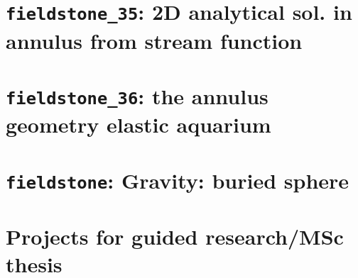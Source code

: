 \documentclass[a4paper]{article}
\begin{document}
\newpage
\section{{\tt fieldstone\_35}: 2D analytical sol. in annulus from stream function \label{f35}}


\newpage
\section{{\tt fieldstone\_36}: the annulus geometry elastic aquarium \label{f36}}




\newpage
\section{{\tt fieldstone}: Gravity: buried sphere}



\newpage
\section{Projects for guided research/MSc thesis} %




\appendix

\newpage
%

\newpage %

\printindex %

\newpage %
\listoftodos[Notes] %
\end{document}
